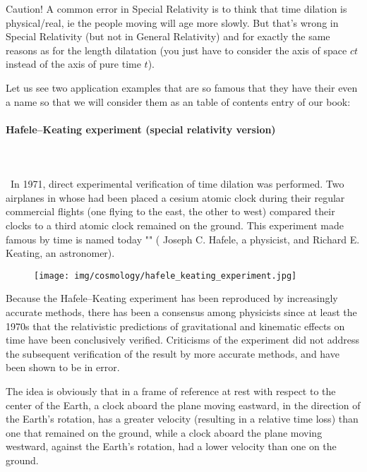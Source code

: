	\begin{tcolorbox}[colback=red!5,borderline={1mm}{2mm}{red!5},arc=0mm,boxrule=0pt]
	\bcbombe Caution! A common error in Special Relativity is to think that time dilation is physical/real, ie the people moving will age more slowly. But that's wrong in Special Relativity (but not in General Relativity) and for exactly the same reasons as for the length dilatation (you just have to consider the axis of space $ct$ instead of the axis of pure time $t$).
	\end{tcolorbox}
	
	Let us see two application examples that are so famous that they have their even a name so that we will consider them as an table of contents entry of our book:
	
	\paragraph{Hafele–Keating experiment (special relativity version)}\label{hafele keating experiment special relativity}\mbox{}\\\\\
	In 1971, direct experimental verification of time dilation was performed. Two airplanes in whose had been placed a cesium atomic clock during their regular commercial flights (one flying to the east, the other to west) compared their clocks to a third  atomic clock remained on the ground. This experiment made famous by time is named today "" ( Joseph C. Hafele, a physicist, and Richard E. Keating, an astronomer).
	\begin{figure}[H]
		\centering
		\texttt{[image: img/cosmology/hafele\_keating\_experiment.jpg]}
	\end{figure}
	Because the Hafele–Keating experiment has been reproduced by increasingly accurate methods, there has been a consensus among physicists since at least the 1970s that the relativistic predictions of gravitational and kinematic effects on time have been conclusively verified. Criticisms of the experiment did not address the subsequent verification of the result by more accurate methods, and have been shown to be in error.

	The idea is obviously that in a frame of reference at rest with respect to the center of the Earth, a clock aboard the plane moving eastward, in the direction of the Earth's rotation, has a greater velocity (resulting in a relative time loss) than one that remained on the ground, while a clock aboard the plane moving westward, against the Earth's rotation, had a lower velocity than one on the ground.
	
